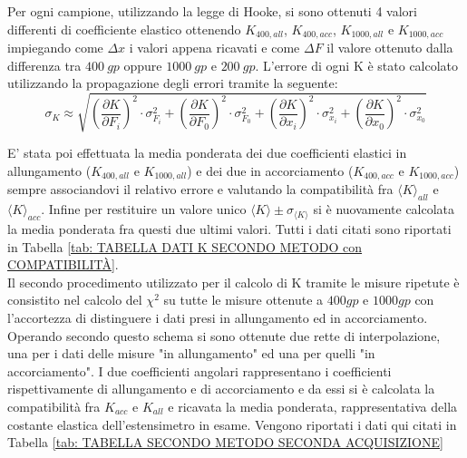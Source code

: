 \documentclass[a4paper,11pt,oneside]{article}
\begin{document}
Per ogni campione, utilizzando la legge di Hooke, si sono ottenuti 4 valori differenti di coefficiente elastico ottenendo $K_{400, all}$, $K_{400, acc}$, $K_{1000, all}$ e $K_{1000, acc}$ impiegando come $\Delta x$ i valori appena ricavati e come $\Delta F$ il valore ottenuto dalla differenza tra $\SI{400}{gp}$ oppure $\SI{1000}{gp} $ e $ \SI{200}{gp}$. L'errore di ogni K è stato calcolato utilizzando la propagazione degli errori tramite la seguente:
\begin{equation*}
\sigma_K \approx \sqrt{\left ( \frac{\partial K }{\partial F_i} \right )^2 \cdot  \sigma_{ F_i}^2 +
\left (\frac{\partial K }{\partial F_0} \right )^2 \cdot  \sigma_{ F_0}^2 +
\left ( \frac{\partial K }{\partial x_i} \right )^2 \cdot  \sigma_{x_i}^2 +
\left ( \frac{\partial K }{\partial x_0} \right )^2\cdot  \sigma_{x_0} ^2 }

\end{equation*}







E' stata poi effettuata la media ponderata dei due coefficienti elastici in allungamento ($K_{400, all}$ e $K_{1000, all}$) e dei due in accorciamento ($K_{400, acc}$ e $K_{1000, acc}$) sempre associandovi il relativo errore e valutando la compatibilità fra ${\langle K \rangle}_{all}$ e ${\langle K \rangle}_{acc}$. Infine per restituire un valore unico $\langle K \rangle \pm \sigma_{\langle K \rangle}$ si è nuovamente calcolata la media ponderata fra questi due ultimi valori. Tutti i dati citati sono riportati in Tabella \ref{tab: TABELLA DATI K SECONDO METODO con COMPATIBILITÀ}.\\%



Il secondo procedimento utilizzato per il calcolo di K tramite le misure ripetute è consistito nel calcolo del $\chi^2$ su tutte le misure ottenute a $\SI{400}gp$ e $\SI{1000}gp$ con l'accortezza di distinguere i dati presi in allungamento ed in accorciamento. Operando secondo questo schema si sono ottenute due rette di interpolazione, una per i dati delle misure "in allungamento" ed una per quelli "in accorciamento". I due coefficienti angolari rappresentano i coefficienti rispettivamente di allungamento e di accorciamento e da essi si è calcolata la compatibilità fra ${K}_{acc}$ e ${K}_{all}$ e ricavata la media ponderata, rappresentativa della costante elastica dell'estensimetro in esame. Vengono riportati i dati qui citati in Tabella \ref{tab: TABELLA SECONDO METODO SECONDA ACQUISIZIONE}%
\end{document}

